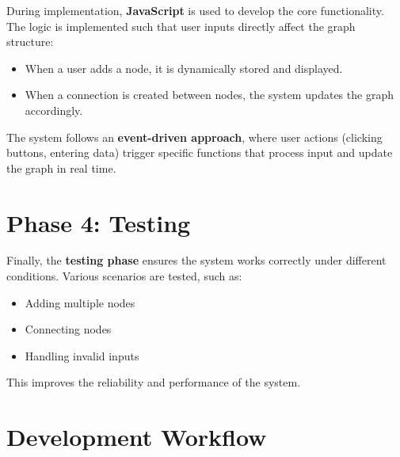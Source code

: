 \documentclass{article}
\begin{document}
During implementation, \textbf{JavaScript} is used to develop the core functionality. The logic is implemented such that user inputs directly affect the graph structure:

\begin{itemize}[leftmargin=2em, label={\color{PrimaryBlue}\faCode}]
  \item When a user adds a node, it is dynamically stored and displayed.
  \item When a connection is created between nodes, the system updates the graph accordingly.
\end{itemize}

The system follows an \textbf{event-driven approach}, where user actions (clicking buttons, entering data) trigger specific functions that process input and update the graph in real time.

\section{Phase 4: Testing}

Finally, the \textbf{testing phase} ensures the system works correctly under different conditions. Various scenarios are tested, such as:

\begin{itemize}[leftmargin=2em, label={\color{SuccessGreen}\faCheckCircle}]
  \item Adding multiple nodes
  \item Connecting nodes
  \item Handling invalid inputs
\end{itemize}

This improves the reliability and performance of the system.

\section{Development Workflow}

\begin{center}
\end{center}
\end{document}
